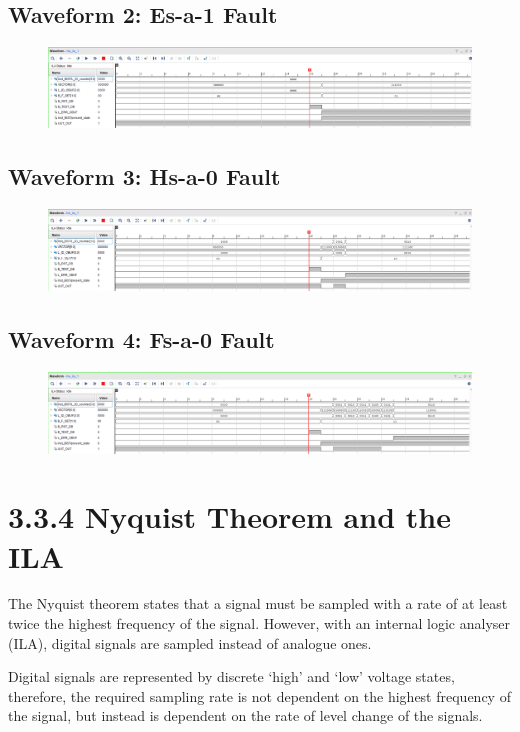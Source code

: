 \documentclass[11pt]{report}
\begin{document}
\subsection*{Waveform 2: Es-a-1 Fault}
\begin{figure}[H]
    \includegraphics[width=\columnwidth]{Assets/3.3.3_fault-1.png}
\end{figure}

\subsection*{Waveform 3: Hs-a-0 Fault}
\begin{figure}[H]
    \includegraphics[width=\columnwidth]{Assets/3.3.3_fault-2.png}
\end{figure}

\subsection*{Waveform 4: Fs-a-0 Fault}
\begin{figure}[H]
    \includegraphics[width=\columnwidth]{Assets/3.3.3_fault-3.png}
\end{figure}

\section*{3.3.4 Nyquist Theorem and the ILA}
The Nyquist theorem states that a signal must be sampled with a rate of at least twice the highest frequency of the signal. However, with an internal logic analyser (ILA), digital signals are sampled instead of analogue ones.

Digital signals are represented by discrete `high’ and `low’ voltage states, therefore, the required sampling rate is not dependent on the highest frequency of the signal, but instead is dependent on the rate of level change of the signals.
\end{document}

